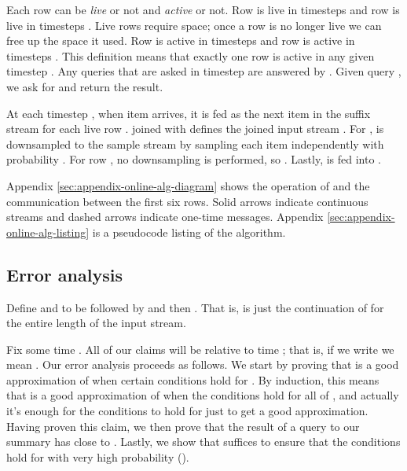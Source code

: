 \documentclass{article}
\theoremstyle{plain}
\begin{document}
Each row can be \emph{live} or not and \emph{active} or not. Row  is live in
timesteps  and row  is live in timesteps . Live rows require space; once a row is no longer live we can
free up the space it used. Row  is active in timesteps  and
row  is active in timesteps . This
definition means that exactly one row  is active in any given timestep
. Any queries that are asked in timestep  are answered by .
Given query , we ask  for  and return the
result.

At each timestep , when item  arrives, it is fed as the next item in the
suffix stream  for each live row .  joined with  defines the
joined input stream . For ,  is downsampled to the sample
stream  by sampling each item independently with probability .
For row , no downsampling is performed, so . Lastly,  is fed
into .

Appendix \ref{sec:appendix-online-alg-diagram} shows the operation of and the
communication between the first six rows. Solid arrows indicate continuous
streams and dashed arrows indicate one-time messages. Appendix
\ref{sec:appendix-online-alg-listing} is a pseudocode listing of the algorithm.



\subsection{Error analysis}
\label{sec:online-error}

Define  and  to be
 followed by  and then . That is,  is just the continuation
of  for the entire length of the input stream.

Fix some time . All of our claims will be relative to time ; that is, if
we write  we mean . Our error analysis proceeds as follows. We
start by proving that  is a good approximation of
 when certain conditions hold for . By induction,
this means that  is a good approximation of 
when the conditions hold for all of , and actually it's
enough for the conditions to hold for just 
to get a good approximation. Having proven this claim, we then prove that the
result  of a query to our summary has  close to
. Lastly, we show that  suffices to ensure that the
conditions hold for  with very high
probability ().
\end{document}
